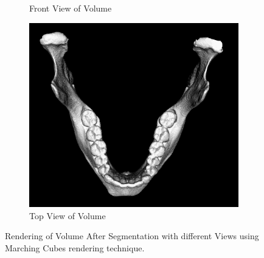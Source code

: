 \documentclass[11.5pt, b5paper]{article}
\begin{document}
\begin{figure}
\begin{subfigure}[b]{0.33\textwidth}
        \caption{Front View of Volume}
    \end{subfigure}
      \hfill
    \begin{subfigure}[b]{0.33\textwidth}
        \centering
        \includegraphics[width=\textwidth]{MCT}
        \caption{Top View of Volume}
    \end{subfigure}
    \caption{Rendering of Volume After Segmentation with different Views using  Marching Cubes rendering technique.}
    \label{fig:MC}
\end{figure}
\end{document}
